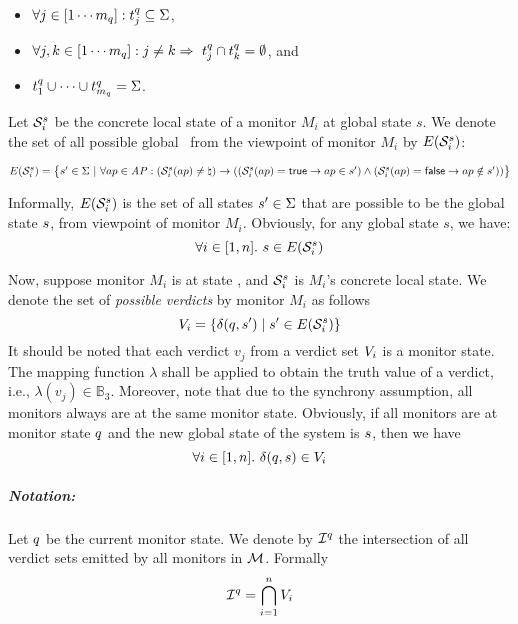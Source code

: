 \begin{itemize}
 \item $\forall j \in [1 \cdots m_q]: t_j^q \subseteq 
\Sigma$,
  \item $\forall j,k \in [1 \cdots 
m_q]: j \neq k \Rightarrow  ~  t_j^q \cap t_k^q = \emptyset$, and
  \item $t_1^q \cup \cdots \cup t_{m_q}^q = \Sigma$.
\end{itemize}


Let $\mathcal{S}_i^s$ be the concrete local state of a monitor $M_i$ at global 
state $s$. We denote the set of all possible global \events~from the viewpoint 
of monitor $M_i$ by $E(\mathcal{S}_i^s)$:
\begin{center}
$E(\mathcal{S}_i^s) = \big\{ s' \in \Sigma ~|~ \forall ap \in \mathit{AP}: 
(\mathcal{S}_i^s(ap) \neq \natural) \rightarrow ( (\mathcal{S}_i^s(ap) = \mathsf{true} 
\rightarrow ap \in s') \wedge  (\mathcal{S}_i^s(ap) = \mathsf{false} \rightarrow ap 
\notin s') ) \big\} $
\end{center}

Informally, $E(\mathcal{S}_i^s)$ is the set of all states $s' \in 
\Sigma$ that are possible to be the global state $s$, from viewpoint of 
monitor $M_i$. Obviously, for any global state $s$, we have: 
$$\forall i \in [1, n].~ s \in E(\mathcal{S}_i^s)$$

Now, suppose \LTLtri monitor $M_i$ is at state \monstate, and 
$\mathcal{S}_i^s$ is $M_i$'s concrete local state. We denote the set of {\em 
possible verdicts} by monitor $M_i$ as follows
$$V_i = \{\delta(q, s') \mid s' \in 
E(\mathcal{S}_i^s)\}$$
It should be noted that each verdict $v_j$ from a verdict set $V_i$ is a 
monitor state. The mapping function $\lambda$ shall be applied to obtain the 
truth value of a verdict, i.e., $\lambda(v_j) \in \mathbb{B}_3$. Moreover, note 
that due to the synchrony assumption, all monitors always are at the same 
monitor state. Obviously, if all monitors are at monitor state $q$ and 
the new global state of the system is $s$, then we have
$$\forall i \in [1, n].~ \delta(q, s) \in V_i$$

\subparagraph{Notation:} Let $q$ be the current monitor state. We 
denote by $\mathcal{I}^q$ the intersection of all verdict sets emitted by 
all monitors in $\mathcal{M}$. Formally
$$ \mathcal{I}^q = \bigcap_{i = 1}^n  V_i$$ 

